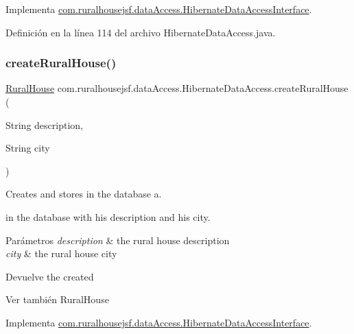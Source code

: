 Implementa \mbox{\hyperlink{a00148_a31f9cb8a3c8f0b42dee19b03f052cd62}{com.\+ruralhousejsf.\+data\+Access.\+Hibernate\+Data\+Access\+Interface}}.



Definición en la línea 114 del archivo Hibernate\+Data\+Access.\+java.

\mbox{\label{a00144_a23eafc2c1f43052f2005a863d6592abc}} 
\subsubsection{\texorpdfstring{createRuralHouse()}{createRuralHouse()}}
{\footnotesize\ttfamily \mbox{\hyperlink{a00188}{Rural\+House}} com.\+ruralhousejsf.\+data\+Access.\+Hibernate\+Data\+Access.\+create\+Rural\+House (\begin{DoxyParamCaption}\item[{String}]{description,  }\item[{String}]{city }\end{DoxyParamCaption})}



Creates and stores in the database a. 


\begin{DoxyCode}{0}
\end{DoxyCode}
 in the database with his description and his city.


\begin{DoxyParams}{Parámetros}
{\em description} & the rural house description \\
\hline
{\em city} & the rural house city\\
\hline
\end{DoxyParams}
\begin{DoxyReturn}{Devuelve}
the created
\begin{DoxyCode}{0}
\end{DoxyCode}

\end{DoxyReturn}
\begin{DoxySeeAlso}{Ver también}
Rural\+House 
\end{DoxySeeAlso}


Implementa \mbox{\hyperlink{a00148_a4c8bc4e3b076f4fc75efb878cc2c1c21}{com.\+ruralhousejsf.\+data\+Access.\+Hibernate\+Data\+Access\+Interface}}.




